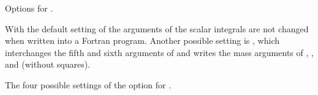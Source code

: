  {Options for .}

With the default setting  of  the arguments of the
scalar integrals are not changed when written into a Fortran program.
Another possible setting is , which  interchanges the fifth and sixth arguments
of  and writes the mass arguments of , ,  and
 (without squares).

 {The four possible settings of the option  for .}



